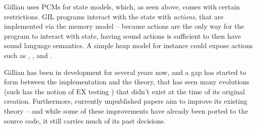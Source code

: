 Gillian uses PCMs for state models, which, as seen above, comes with certain restrictions. GIL programs interact with the state with \emph{actions}, that are implemented via the memory model -- because actions are the only way for the program to interact with state, having sound actions is sufficient to then have sound language semantics. A simple heap model for instance could expose actions such as , ,  and .

Gillian has been in development for several years now, and a gap has started to form between the implementation and the theory, that has seen many evolutions (such has the notion of EX testing \cite{exactsl}) that didn't exist at the time of its original creation. Furthermore, currently unpublished papers aim to improve its existing theory -- and while some of these improvements have already been ported to the source code, it still carries much of its past decisions.
